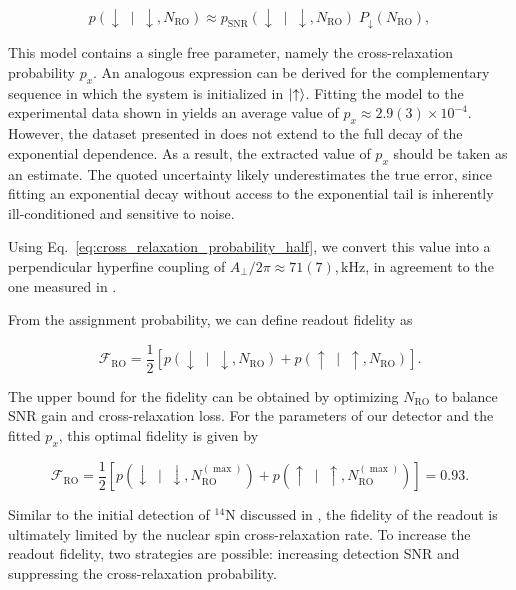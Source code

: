 \begin{equation}
    p(\downarrow \; \mid \; \downarrow, N_{\mathrm{RO}}) \approx p_{\mathrm{SNR}}(\downarrow \; \mid \; \downarrow, N_{\mathrm{RO}})\; P_{\downarrow}(N_{\mathrm{RO}}),
\end{equation}

This model contains a single free parameter, namely the cross-relaxation probability $p_x$. An analogous expression can be derived for the complementary sequence in which the system is initialized in $\ket{\uparrow}$. Fitting the model to the experimental data shown in  yields an average value of $p_x \approx 2.9(3)\times 10^{-4}$. However, the dataset presented in  does not extend to the full decay of the exponential dependence. As a result, the extracted value of $p_x$ should be taken as an estimate. The quoted uncertainty likely underestimates the true error, since fitting an exponential decay without access to the exponential tail is inherently ill-conditioned and sensitive to noise.

Using Eq.~\ref{eq:cross_relaxation_probability_half}, we convert this value into a perpendicular hyperfine coupling of
$A_\perp/2\pi \approx 71(7),\text{kHz}$, in agreement to the one measured in .

From the assignment probability, we can define readout fidelity as 

\begin{equation}
    \mathcal{F}_\mathrm{RO} =\frac{1}{2} \left[p\left(\downarrow \; \mid \; \downarrow, N_{\mathrm{RO}}\right) + p\left(\uparrow \; \mid \; \uparrow, N_{\mathrm{RO}}\right) \right].
\end{equation}

The upper bound for the fidelity can be obtained by optimizing $N_{\mathrm{RO}}$ to balance SNR gain and cross-relaxation loss. For the parameters of our detector and the fitted $p_x$, this optimal fidelity is given by

\begin{equation}
    \mathcal{F}_\mathrm{RO} =\frac{1}{2} \left[p\left(\downarrow \; \mid \; \downarrow, N^{(\max)}_{\mathrm{RO}}\right) + p\left(\uparrow \; \mid \; \uparrow, N^{(\max)}_{\mathrm{RO}}\right) \right] = 0.93.
\end{equation}

Similar to the initial detection of $^{14}\mathrm{N}$ discussed in , the fidelity of the readout is ultimately limited by the nuclear spin cross-relaxation rate. To increase the readout fidelity, two strategies are possible: increasing detection SNR and suppressing the cross-relaxation probability.

